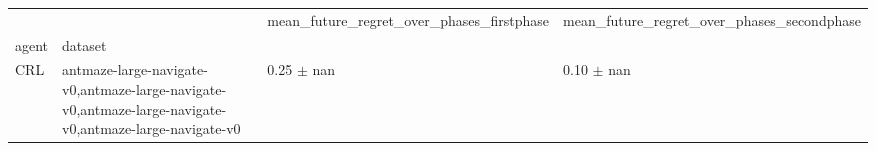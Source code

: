 \begin{tabular}{llll}
\toprule
 &  & mean_future_regret_over_phases_firstphase & mean_future_regret_over_phases_secondphase \\
agent & dataset &  &  \\
\midrule
CRL & antmaze-large-navigate-v0,antmaze-large-navigate-v0,antmaze-large-navigate-v0,antmaze-large-navigate-v0 & 0.25 $\pm$ nan & 0.10 $\pm$ nan \\
\cline{1-4}
\bottomrule
\end{tabular}
